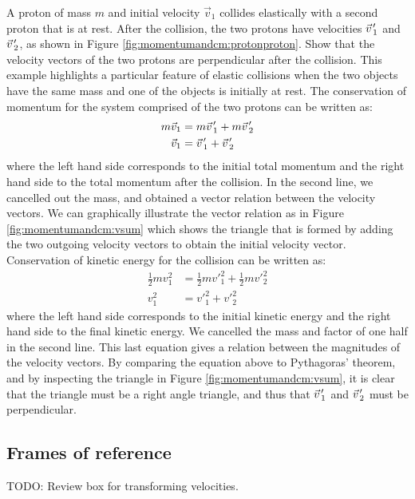 \begin{example}{
 A proton of mass $m$ and initial velocity $\vec v_1$ collides elastically with a second proton that is at rest. After the collision, the two protons have velocities $\pvec v'_1$ and $\pvec v'_2$, as shown in Figure \ref{fig:momentumandcm:protonproton}. Show that the velocity vectors of the two protons are perpendicular after the collision.}
This example highlights a particular feature of elastic collisions when the two objects have the same mass and one of the objects is initially at rest. The conservation of momentum for the system comprised of the two protons can be written as:
\begin{align*}
m\vec v_1 &= m\pvec v'_1 + m\pvec v'_2\\
\vec v_1 &= \pvec v'_1 + \pvec v'_2
\end{align*}
where the left hand side corresponds to the initial total momentum and the right hand side to the total momentum after the collision. In the second line, we cancelled out the mass, and obtained a vector relation between the velocity vectors. We can graphically illustrate the vector relation as in Figure \ref{fig:momentumandcm:vsum} which shows the triangle that is formed by adding the two outgoing velocity vectors to obtain the initial velocity vector.
Conservation of kinetic energy for the collision can be written as:
\begin{align*}
\frac{1}{2}mv_1^2 &= \frac{1}{2}mv'^2_1+\frac{1}{2}mv'^2_2\\
v_1^2 &= v'^2_1+ v'^2_2
\end{align*}
where the left hand side corresponds to the initial kinetic energy and the right hand side to the final kinetic energy. We cancelled the mass and factor of one half in the second line. This last equation gives a relation between the magnitudes of the velocity vectors. By comparing the equation above to Pythagoras' theorem, and by inspecting the triangle in Figure \ref{fig:momentumandcm:vsum}, it is clear that the triangle must be a right angle triangle, and thus that $\pvec v'_1$ and $\pvec v'_2$ must be perpendicular.
\end{example}

\subsection{Frames of reference}
TODO: Review box for transforming velocities.

